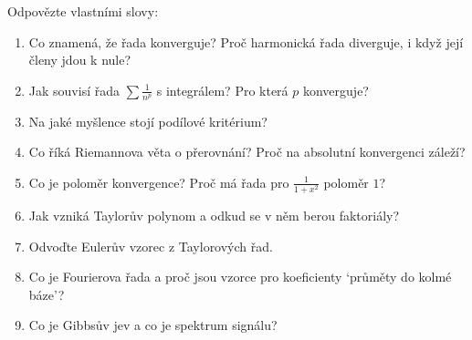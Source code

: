 \begin{problem}
  Odpovězte vlastními slovy:
  \begin{enumerate}
    \item Co znamená, že řada konverguje? Proč harmonická řada diverguje, i když její členy jdou k nule?
    \item Jak souvisí řada $\sum\frac{1}{n^p}$ s integrálem? Pro která $p$ konverguje?
    \item Na jaké myšlence stojí podílové kritérium?
    \item Co říká Riemannova věta o přerovnání? Proč na absolutní konvergenci záleží?
    \item Co je poloměr konvergence? Proč má řada pro $\frac{1}{1 + x^2}$ poloměr $1$?
    \item Jak vzniká Taylorův polynom a odkud se v něm berou faktoriály?
    \item Odvoďte Eulerův vzorec z Taylorových řad.
    \item Co je Fourierova řada a proč jsou vzorce pro koeficienty `průměty do kolmé báze'?
    \item Co je Gibbsův jev a co je spektrum signálu?
  \end{enumerate}
\end{problem}
